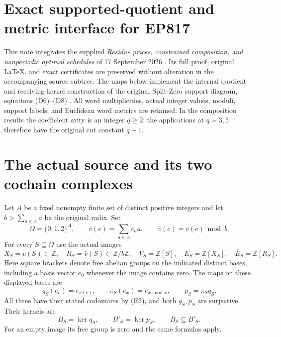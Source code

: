 \documentclass[11pt,a4paper]{article}
\begin{document}
\endgroup

\clearpage
\begingroup
\def\Z{\mathbb Z}
\def\C{\mathbb C}
\def\R{\mathbb R}

\setcounter{equation}{0}
\renewcommand{\theequation}{EP.\arabic{equation}}
\section*{Exact supported-quotient and metric interface for EP817}



This note integrates the supplied \emph{Residue prices, constrained composition,
and nonperiodic optimal schedules} of 17 September 2026
\cite{ep:continuation}.  Its full proof, original LaTeX, and exact certificates
are preserved without alteration in the accompanying source subtree.
The maps below implement the internal quotient and receiving-kernel construction
of the original Split-Zero support diagram, equations (D6)--(D8)
\cite{ep:support}.  All word multiplicities, actual integer values, moduli,
support labels, and Euclidean word metrics are retained.  In the
composition results the coefficient arity is an integer \(q\geq2\);
the applications at \(q=3,5\) therefore have the original cut constant \(q-1\).

\section{The actual source and its two cochain complexes}

Let \(A\) be a fixed nonempty finite set of distinct positive integers and
let \(b>\sum_{a\in A}a\) be the original radix.  Set
\[
 \Omega=\{0,1,2\}^{A},\qquad
 v(c)=\sum_{a\in A}c_a a,\qquad
 \bar v(c)=v(c)\bmod b .
 \tag{E1}
\]
For every \(S\subseteq\Omega\) use the actual images
\[
 X_S=v(S)\subset\Z,\quad R_S=\bar v(S)\subset\Z/b\Z,\quad
 V_S=\Z[S],\quad E_S=\Z[X_S],\quad \bar E_S=\Z[R_S].
 \tag{E2}
\]
Here square brackets denote free abelian groups on the indicated distinct
bases, including a basis vector \(e_0\) whenever the image contains zero.
The maps on these displayed bases are
\[
 q_S(e_c)=e_{v(c)},\qquad
 \pi_S(e_x)=e_{x\bmod b},\qquad p_S=\pi_Sq_S.
 \tag{E3}
\]
All three have their stated codomains by (E2), and both \(q_S,p_S\) are
surjective.  Their kernels are
\[
 B_S=\ker q_S,\qquad B'_S=\ker p_S,\qquad B_S\subseteq B'_S .
 \tag{E4}
\]
For an empty image its free group is zero and the same formulas apply.
\end{document}
